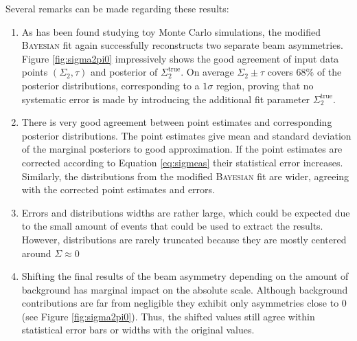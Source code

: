 Several remarks can be made regarding these results:
\begin{enumerate}
	\item As has been found studying toy Monte Carlo simulations, the modified \textsc{Bayesian} fit again successfully reconstructs two separate beam asymmetries. Figure \ref{fig:sigma2pi0} impressively shows the good agreement of input data points $\left(\Sigma_2,\tau\right)$ and posterior of $\Sigma_2^\text{true}$. On average $\Sigma_2\pm\tau$ covers $68\%$ of the posterior distributions, corresponding to a $1\sigma$ region, proving that no systematic error is made by introducing the additional fit parameter $\Sigma_2^\text{true}$.
	\item There is very good agreement between point estimates and corresponding posterior distributions. The point estimates give mean and standard deviation of the marginal posteriors to good approximation. If the point estimates are corrected according to Equation \eqref{eq:sigmeas} their statistical error increases. Similarly, the distributions from the modified \textsc{Bayesian} fit are wider, agreeing with the corrected point estimates and errors.
	\item Errors and distributions widths are rather large, which could be expected due to the small amount of events that could be used to extract the results. However, distributions are rarely truncated because they are mostly centered around $\Sigma\approx0$
	\item Shifting the final results of the beam asymmetry depending on the amount of background has marginal impact on the absolute scale. Although background contributions are far from negligible they exhibit only asymmetries close to $0$ (see Figure \ref{fig:sigma2pi0}). Thus, the shifted values still agree within statistical error bars or widths with the original values.
\end{enumerate}

